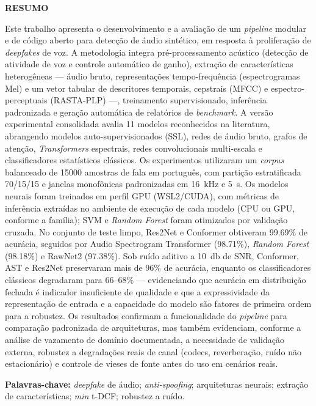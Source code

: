 \documentclass[12pt,a4paper]{article}
\begin{document}
\begin{center}\textbf{RESUMO}\end{center}
\vspace{0.5cm}
\begin{singlespace}
\noindent
Este trabalho apresenta o desenvolvimento e a avaliação de um \textit{pipeline}
modular e de código aberto para detecção de áudio sintético, em resposta à
proliferação de \textit{deepfakes} de voz. A metodologia integra
pré-processamento acústico (detecção de atividade de voz e controle automático
de ganho), extração de características heterogêneas --- áudio bruto,
representações tempo-frequência (espectrogramas Mel) e um vetor tabular de
descritores temporais, cepstrais (MFCC) e espectro-perceptuais (RASTA-PLP) ---,
treinamento supervisionado, inferência padronizada e geração automática de
relatórios de \textit{benchmark}. A versão experimental consolidada avalia
\num{11} modelos reconhecidos na literatura, abrangendo modelos
auto-supervisionados (SSL), redes de áudio bruto, grafos de atenção,
\textit{Transformers} espectrais, redes convolucionais multi-escala e
classificadores estatísticos clássicos. Os experimentos utilizaram um
\textit{corpus} balanceado de \num{15000} amostras de fala em português, com
partição estratificada 70/15/15 e janelas monofônicas padronizadas em
\SI{16}{\kilo\hertz} e \SI{5}{\second}. Os modelos neurais foram treinados em
perfil GPU (WSL2/CUDA), com métricas de inferência extraídas no ambiente de
execução de cada modelo (CPU ou GPU, conforme a família); SVM e \textit{Random
Forest} foram otimizados por validação cruzada. No conjunto de teste limpo, Res2Net e Conformer obtiveram
\num{99,69}\% de acurácia, seguidos por Audio Spectrogram Transformer
(\num{98,71}\%), \textit{Random Forest} (\num{98,18}\%) e RawNet2
(\num{97,38}\%). Sob ruído aditivo a \SI{10}{\decibel} de SNR, Conformer, AST
e Res2Net preservaram mais de \num{96}\% de acurácia, enquanto os
classificadores clássicos degradaram para \num{66}--\num{68}\% ---
evidenciando que acurácia em distribuição fechada é indicador insuficiente de
qualidade e que a expressividade da representação de entrada e a capacidade do
modelo são fatores de primeira ordem para a robustez. Os resultados confirmam a funcionalidade do
\textit{pipeline} para comparação padronizada de arquiteturas, mas também
evidenciam, conforme a análise de vazamento de domínio documentada, a
necessidade de validação externa, robustez a degradações reais de canal
(codecs, reverberação, ruído não estacionário) e controle de vieses de fonte
antes do uso em cenários reais.

\vspace{0.4cm}
\noindent\textbf{Palavras-chave:} \textit{deepfake} de áudio;
\textit{anti-spoofing}; arquiteturas neurais; extração de características;
\textit{min} t-DCF; robustez a ruído.
\end{singlespace}
\end{document}
